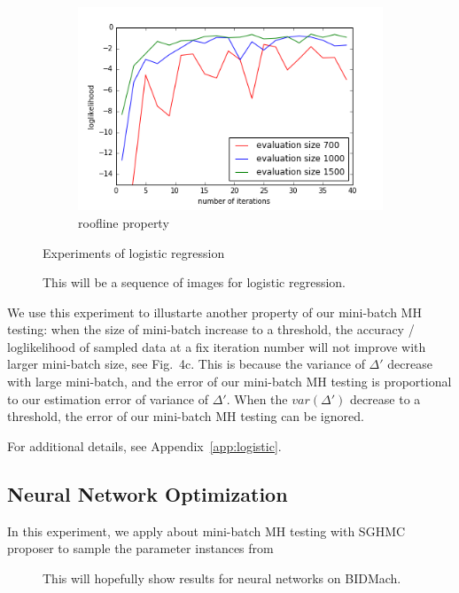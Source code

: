 \documentclass{article}
\begin{document}
\begin{figure}
\begin{subfigure}[b]{0.32\textwidth}
        \includegraphics[width=\textwidth]{./figures/roofline_hyc.png}
        \caption{roofline property}
        \label{fig:logistic_roof}
    \end{subfigure}
    \caption{Experiments of logistic regression}\label{fig:logistic}
\end{figure}

\begin{figure}[ht]
  \centering
  \fbox{\rule[-.5cm]{0cm}{4cm} \rule[-.5cm]{4cm}{0cm}}
  \caption{This will be a sequence of images for logistic regression.}
\end{figure}

We use this experiment to illustarte another property of our mini-batch MH testing: when the size of mini-batch increase to a threshold, the accuracy / loglikelihood of sampled data at a fix iteration number will not improve with larger mini-batch size, see Fig.~4c. This is because the variance of $\Delta'$ decrease with large mini-batch, and the error of our mini-batch MH testing is proportional to our estimation error of variance of $\Delta'$. When the $var(\Delta')$ decrease to a threshold, the error of our mini-batch MH testing can be ignored.  

{\color{blue}

For additional details, see Appendix~\ref{app:logistic}.
}

\subsection{Neural Network Optimization}\label{ssec:nets}
In this experiment, we apply about mini-batch MH testing with SGHMC proposer to sample the parameter instances from 
\begin{figure}[ht]
  \centering
  \fbox{\rule[-.5cm]{0cm}{4cm} \rule[-.5cm]{4cm}{0cm}}
  \caption{This will hopefully show results for neural networks on BIDMach.}
\end{figure}
\end{document}
